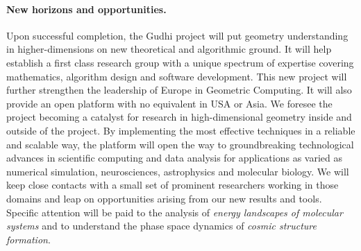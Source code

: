 



\vspace{-3.1mm}

\paragraph{New horizons and opportunities.} 




Upon successful completion, the Gudhi project will put geometry understanding in higher-dimensions on new theoretical and algorithmic ground. It will help establish a first class research group with a unique spectrum of expertise covering mathematics, algorithm design and software development.  This new project will further strengthen the leadership of Europe in Geometric Computing.  It will also provide an open platform with no equivalent in USA or Asia.  We foresee the project becoming a catalyst for research in high-dimensional geometry inside and outside of the project.  By implementing the most effective techniques in a reliable and scalable way, the platform will open the way to groundbreaking technological advances in scientific computing and data analysis for applications as varied as numerical simulation, neurosciences, astrophysics and molecular biology. We will keep close contacts with a small set of prominent researchers working in those domains and leap on opportunities arising from our new results and tools.  Specific attention will be paid to the analysis of {\em energy landscapes of molecular systems} and to understand the phase space dynamics of {\em cosmic structure formation}.

